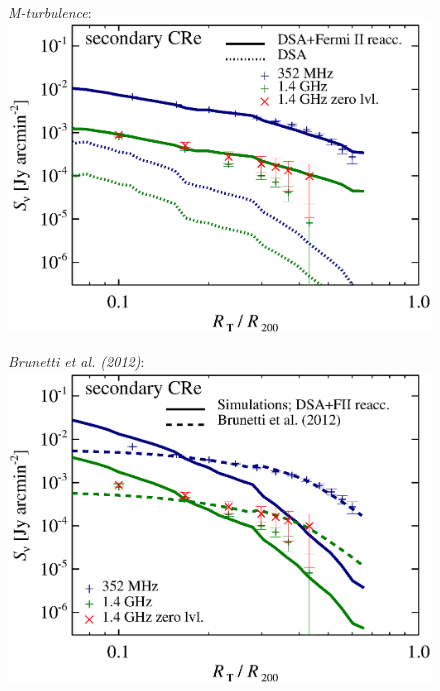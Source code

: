\documentclass[a4paper,fleqn,usenatbib]{mnras}
\newcommand{\Mflatturb}{{\it M-turbulence}\xspace}
\begin{document}
\begin{figure}
\begin{minipage}{1\columnwidth}
\begin{center}
   \end{center}
\end{minipage}
\\
\begin{minipage}{1\columnwidth}
  \begin{center}\Large{\Mflatturb:}\\ 
    \includegraphics[width=\columnwidth]{sbright.nu.DIIcomp.I0.g72a.Rad14.2400p.z0.NL.xKR.eb23.eI067.140.v6.eps}
  \end{center}
\end{minipage}
\begin{minipage}{1\columnwidth}
   \begin{center}\Large{\it Brunetti et al. (2012)}:\\
     \includegraphics[width=\columnwidth]{sbright.nu.DIIcomp.Brunetti.g72a.Rad14.2400p.z0.NL.xKR.eb23.140.v6.eps}

\end{center}
\end{minipage}
\end{figure}
\end{document}
